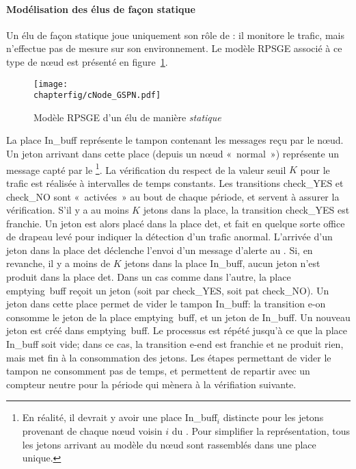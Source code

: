             \paragraph{Modélisation des \cns élus de façon statique}
Un \cn élu de façon statique joue uniquement son rôle de \cn: il monitore le trafic, mais n'effectue pas de mesure sur son environnement.
Le modèle RPSGE associé à ce type de nœud est présenté en figure~\ref{sa:fig:cnodegspn1}.
\begin{figure}[H]
    \centering
    \texttt{[image: \\chapterfig/cNode\_GSPN.pdf]}
    \caption{Modèle RPSGE d'un \cn élu de manière \emph{statique}}\label{sa:fig:cnodegspn1}
\end{figure}
La place \textsf{In\_buff} représente le tampon contenant les messages reçu par le nœud.
Un jeton arrivant dans cette place (depuis un nœud «~normal~») représente un message capté par le \cn\footnote{En réalité, il devrait y avoir une place \textsf{In\_buff$_i$} distincte pour les jetons provenant de chaque nœud voisin $i$ du \cn. Pour simplifier la représentation, tous les jetons arrivant au modèle du nœud sont rassemblés dans une place unique.}.
La vérification du respect de la valeur seuil $K$ pour le trafic est réalisée à intervalles de temps constants.
Les transitions \textsf{check\_YES} et \textsf{check\_NO} sont «~activées~» au bout de chaque période, et servent à assurer la vérification.
S'il y a au moins $K$ jetons dans la place, la transition \textsf{check\_YES} est franchie.
Un jeton est alors placé dans la place \textsf{det}, et fait en quelque sorte office de drapeau levé pour indiquer la détection d'un trafic anormal.
L'arrivée d'un jeton dans la place \textsf{det} déclenche l'envoi d'un message d'alerte au \ch.
Si, en revanche, il y a moins de $K$ jetons dans la place \textsf{In\_buff}, aucun jeton n'est produit dans la place \textsf{det}.
Dans un cas comme dans l'autre, la place \textsf{emptying~buff} reçoit un jeton (soit par \textsf{check\_YES}, soit pat \textsf{check\_NO}).
Un jeton dans cette place permet de vider le tampon \textsf{In\_buff}: la transition \textsf{e-on} consomme le jeton de la place \textsf{emptying~buff}, et un jeton de \textsf{In\_buff}.
Un nouveau jeton est créé dans \textsf{emptying~buff}.
Le processus est répété jusqu'à ce que la place \textsf{In\_buff} soit vide; dans ce cas, la transition \textsf{e-end} est franchie et ne produit rien, mais met fin à la consommation des jetons.
Les étapes permettant de vider le tampon ne consomment pas de temps, et permettent de repartir avec un compteur neutre pour la période qui mènera à la vérifiation suivante.

